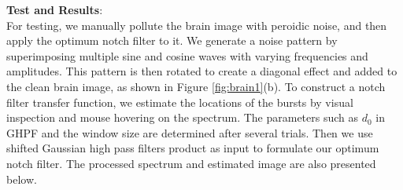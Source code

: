 \documentclass[UTF8]{ctexart}
\begin{document}
\textbf{Test and Results}:\\
For testing, we manually pollute the brain image with peroidic noise, and then apply the optimum notch filter to it. 
We generate a noise pattern by superimposing multiple sine and cosine waves with varying frequencies and amplitudes. 
This pattern is then rotated to create a diagonal effect and added to the clean brain image, as shown in Figure \ref{fig:brain1}(b).
To construct a notch filter transfer function, we estimate the locations of the bursts by visual inspection and mouse hovering on the spectrum.
The parameters such as $d_0$ in GHPF and the window size are determined after several trials.
Then we use shifted Gaussian high pass filters product as input to formulate our optimum notch filter. The processed spectrum and estimated image are
also presented below.\\
\end{document}
